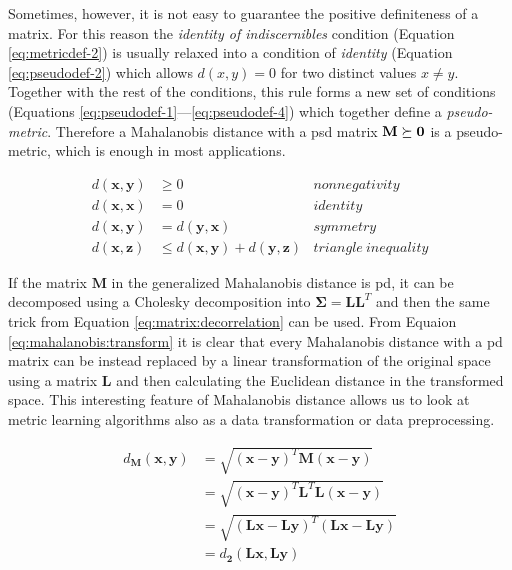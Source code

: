 \documentclass[12pt,a4paper]{report}
\begin{document}
Sometimes, however, it is not easy to guarantee the positive definiteness of a matrix. For this reason the \textit{identity of indiscernibles} condition (Equation \ref{eq:metricdef-2}) is usually relaxed into a condition of \textit{identity} (Equation \ref{eq:pseudodef-2}) which allows $d(x,y)=0$ for two distinct values $x \neq y$. Together with the rest of the conditions, this rule forms a new set of conditions (Equations \ref{eq:pseudodef-1}---\ref{eq:pseudodef-4}) which together define a \textit{pseudo-metric}. Therefore a Mahalanobis distance with a \ac{psd} matrix $\bf{M} \succeq 0$ is a pseudo-metric, which is enough in most applications.

\begin{align}
d(\textbf{x},\textbf{y}) &\geq 0 & nonnegativity \label{eq:pseudodef-1} \\
d(\textbf{x},\textbf{x}) &= 0 & identity \label{eq:pseudodef-2} \\
d(\textbf{x},\textbf{y}) &= d(\textbf{y},\textbf{x}) & symmetry \label{eq:pseudodef-3} \\
d(\textbf{x},\textbf{z}) &\leq d(\textbf{x},\textbf{y}) + d(\textbf{y},\textbf{z}) & triangle \ inequality \label{eq:pseudodef-4}
\end{align} 

If the matrix $\bm{M}$ in the generalized Mahalanobis distance is \ac{pd}, it can be decomposed using a Cholesky decomposition into $\bm{\Sigma}=\bm{L}\bm{L}^T$ and then the same trick from Equation \ref{eq:matrix:decorrelation} can be used. From Equaion \ref{eq:mahalanobis:transform} it is clear that every Mahalanobis distance with a \ac{pd} matrix can be instead replaced by a linear transformation of the original space using a matrix $\bm{L}$ and then calculating the Euclidean distance in the transformed space. This interesting feature of Mahalanobis distance allows us to look at metric learning algorithms also as a data transformation or data preprocessing.

\begin{align}
  d_{\bm{M}}(\textbf{x},\textbf{y}) &= \sqrt{(\textbf{x}-\textbf{y})^{T}\bm{M}(\textbf{x}-\textbf{y})} \nonumber\\
         &= \sqrt{(\textbf{x}-\textbf{y})^{T}\bm{L}^{T}\bm{L}(\textbf{x}-\textbf{y})} \nonumber\\
         &= \sqrt{(\bm{L}\textbf{x}-\bm{L}\textbf{y})^{T}(\bm{L}\textbf{x}-\bm{L}\textbf{y})} \nonumber\\
         &= d_{\bm{2}}(\bm{L}\textbf{x}, \bm{L}\textbf{y}) \label{eq:mahalanobis:transform}
\end{align}
\end{document}
